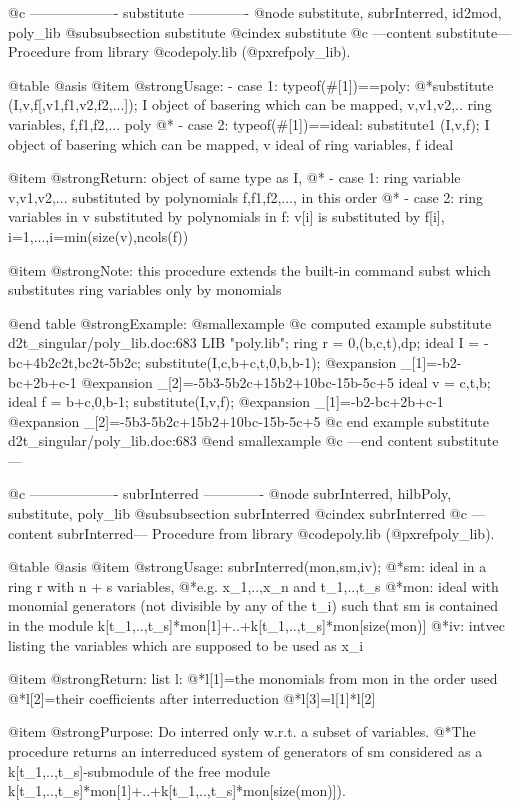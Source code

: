 @c ------------------- substitute -------------
@node substitute, subrInterred, id2mod, poly_lib
@subsubsection substitute
@cindex substitute
@c ---content substitute---
Procedure from library @code{poly.lib} (@pxref{poly_lib}).

@table @asis
@item @strong{Usage:}
- case 1: typeof(#[1])==poly:
@*substitute (I,v,f[,v1,f1,v2,f2,...]); I object of basering which
can be mapped, v,v1,v2,.. ring variables, f,f1,f2,... poly
@* - case 2: typeof(#[1])==ideal:
substitute1 (I,v,f); I object of basering which can be mapped,
v ideal of ring variables, f ideal

@item @strong{Return:}
object of same type as I,
@* - case 1: ring variable v,v1,v2,... substituted by polynomials
f,f1,f2,..., in this order
@* - case 2: ring variables in v substituted by polynomials in f:
v[i] is substituted by f[i], i=1,...,i=min(size(v),ncols(f))

@item @strong{Note:}
this procedure extends the built-in command subst which substitutes
ring variables only by monomials

@end table
@strong{Example:}
@smallexample
@c computed example substitute d2t_singular/poly_lib.doc:683 
LIB "poly.lib";
ring r = 0,(b,c,t),dp;
ideal I = -bc+4b2c2t,bc2t-5b2c;
substitute(I,c,b+c,t,0,b,b-1);
@expansion{} _[1]=-b2-bc+2b+c-1
@expansion{} _[2]=-5b3-5b2c+15b2+10bc-15b-5c+5
ideal v = c,t,b;
ideal f = b+c,0,b-1;
substitute(I,v,f);
@expansion{} _[1]=-b2-bc+2b+c-1
@expansion{} _[2]=-5b3-5b2c+15b2+10bc-15b-5c+5
@c end example substitute d2t_singular/poly_lib.doc:683
@end smallexample
@c ---end content substitute---

@c ------------------- subrInterred -------------
@node subrInterred, hilbPoly, substitute, poly_lib
@subsubsection subrInterred
@cindex subrInterred
@c ---content subrInterred---
Procedure from library @code{poly.lib} (@pxref{poly_lib}).

@table @asis
@item @strong{Usage:}
subrInterred(mon,sm,iv);
@*sm: ideal in a ring r with n + s variables,
@*e.g. x_1,..,x_n and t_1,..,t_s
@*mon: ideal with monomial generators (not divisible by
any of the t_i) such that sm is contained in the module
k[t_1,..,t_s]*mon[1]+..+k[t_1,..,t_s]*mon[size(mon)]
@*iv: intvec listing the variables which are supposed to be used
as x_i

@item @strong{Return:}
list l:
@*l[1]=the monomials from mon in the order used
@*l[2]=their coefficients after interreduction
@*l[3]=l[1]*l[2]

@item @strong{Purpose:}
Do interred only w.r.t. a subset of variables.
@*The procedure returns an interreduced system of generators of
sm considered as a k[t_1,..,t_s]-submodule of the free module
k[t_1,..,t_s]*mon[1]+..+k[t_1,..,t_s]*mon[size(mon)]).

